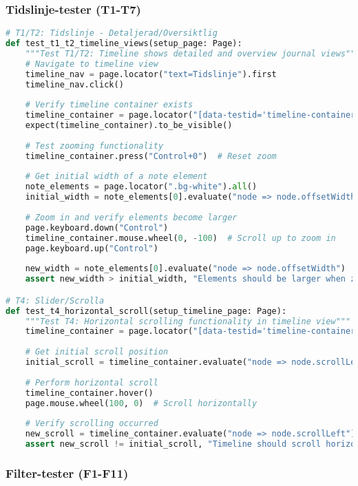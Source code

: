 \subsubsection{Tidslinje-tester (T1-T7)}

\begin{lstlisting}[language=python]
# T1/T2: Tidslinje - Detaljerad/Översiktlig
def test_t1_t2_timeline_views(setup_page: Page):
    """Test T1/T2: Timeline shows detailed and overview journal views"""
    # Navigate to timeline view
    timeline_nav = page.locator("text=Tidslinje").first
    timeline_nav.click()
    
    # Verify timeline container exists
    timeline_container = page.locator("[data-testid='timeline-container']")
    expect(timeline_container).to_be_visible()
    
    # Test zooming functionality
    timeline_container.press("Control+0")  # Reset zoom
    
    # Get initial width of a note element
    note_elements = page.locator(".bg-white").all()
    initial_width = note_elements[0].evaluate("node => node.offsetWidth")
    
    # Zoom in and verify elements become larger
    page.keyboard.down("Control")
    timeline_container.mouse.wheel(0, -100)  # Scroll up to zoom in
    page.keyboard.up("Control")
    
    new_width = note_elements[0].evaluate("node => node.offsetWidth")
    assert new_width > initial_width, "Elements should be larger when zooming in"

# T4: Slider/Scrolla
def test_t4_horizontal_scroll(setup_timeline_page: Page):
    """Test T4: Horizontal scrolling functionality in timeline view"""
    timeline_container = page.locator("[data-testid='timeline-container']")
    
    # Get initial scroll position
    initial_scroll = timeline_container.evaluate("node => node.scrollLeft")
    
    # Perform horizontal scroll
    timeline_container.hover()
    page.mouse.wheel(100, 0)  # Scroll horizontally
    
    # Verify scrolling occurred
    new_scroll = timeline_container.evaluate("node => node.scrollLeft")
    assert new_scroll != initial_scroll, "Timeline should scroll horizontally"
\end{lstlisting}

\subsubsection{Filter-tester (F1-F11)}

